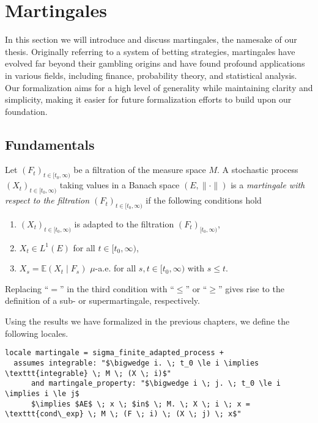 
\chapter{Martingales}\label{chapter:martingales}

In this section we will introduce and discuss martingales, the namesake of our thesis. Originally referring to a system of betting strategies, martingales have evolved far beyond their gambling origins and have found profound applications in various fields, including finance, probability theory, and statistical analysis. Our formalization aims for a high level of generality while maintaining clarity and simplicity, making it easier for future formalization efforts to build upon our foundation.

\section{Fundamentals}

\begin{definition}
	Let $(F_t)_{t \in [t_0,\infty)}$ be a filtration of the measure space $M$. A stochastic process $(X_t)_{t \in [t_0,\infty)}$ taking values in a Banach space $(E, \lVert \cdot \rVert)$ is a \textit{martingale with respect to the filtration $(F_t)_{t \in [t_0,\infty)}$} if the following conditions hold
	\begin{enumerate}
	\item $(X_t)_{t \in [t_0,\infty)}$ is adapted to the filtration $(F_t)_{[t_0,\infty)}$,
	\item $X_t \in L^1(E)$ for all $t \in [t_0, \infty)$,
	\item $X_s = \mathbb{E}(X_t \;\vert\; F_s)$ $\mu$-a.e. for all $s,t \in [t_0,\infty)$ with $s \le t$.
	\end{enumerate}
	Replacing ``$=$'' in the third condition with ``$\le$'' or ``$\ge$'' gives rise to the definition of a sub- or supermartingale, respectively.
\end{definition}

Using the results we have formalized in the previous chapters, we define the following locales.

\begin{isadefinition}
{\small
\begin{lstlisting}[style=isabelle]
locale martingale = sigma_finite_adapted_process +
  assumes integrable: "$\bigwedge i. \; t_0 \le i \implies \texttt{integrable} \; M \; (X \; i)$"
      and martingale_property: "$\bigwedge i \; j. \; t_0 \le i \implies i \le j$
	  $\implies $AE$ \; x \; $in$ \; M. \; X \; i \; x = \texttt{cond\_exp} \; M \; (F \; i) \; (X \; j) \; x$"
\end{lstlisting}
}
\end{isadefinition}

